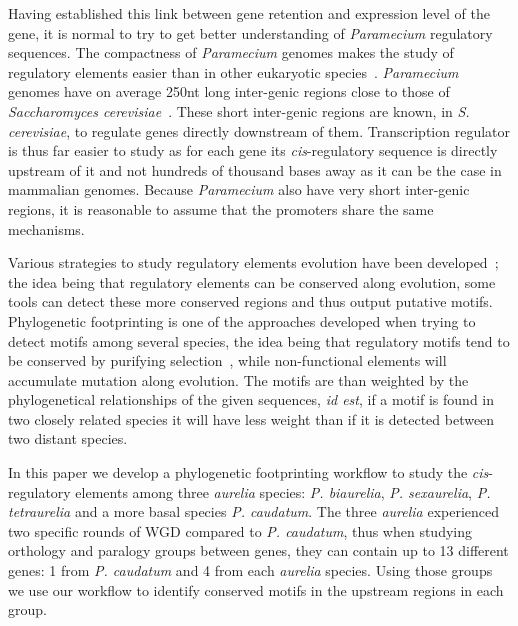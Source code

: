 Having established this link between gene retention and expression level of the gene, it is normal to try to get better understanding of \textit{Paramecium} regulatory sequences. The compactness of \textit{Paramecium} genomes makes the study of regulatory elements easier than in other eukaryotic species~\citep{mcgrath_insights_2014}. \textit{Paramecium} genomes have on average 250nt long inter-genic regions close to those of \textit{Saccharomyces cerevisiae}~\citep{chen_minimal_2011}. These short inter-genic regions are known, in \textit{S. cerevisiae}, to regulate genes directly downstream of them. Transcription regulator is thus far easier to study as for each gene its \textit{cis}-regulatory sequence is directly upstream of it and not hundreds of thousand bases away as it can be the case in mammalian genomes. Because \textit{Paramecium} also have very short inter-genic regions, it is reasonable to assume that the promoters share the same mechanisms.

Various strategies to study regulatory elements evolution have been developed~\citep{wittkopp_cis-regulatory_2012}; the idea being that regulatory elements can be conserved along evolution, some tools can detect these more conserved regions and thus output putative motifs. Phylogenetic footprinting is one of the approaches developed when trying to detect motifs among several species, the idea being that regulatory motifs tend to be conserved by purifying selection~\citep{nelson_conserved_2013}, while non-functional elements will accumulate mutation along evolution. The motifs are than weighted by the phylogenetical relationships of the given sequences, \textit{id est}, if a motif is found in two closely related species it will have less weight than if it is detected between two distant species.

In this paper we develop a phylogenetic footprinting workflow to study the \textit{cis}-regulatory elements among three \textit{aurelia} species: \textit{P. biaurelia}, \textit{P. sexaurelia}, \textit{P. tetraurelia} and a more basal species \textit{P. caudatum}. The three \textit{aurelia} experienced two specific rounds of WGD compared to \textit{P. caudatum}, thus when studying orthology and paralogy groups between genes, they can contain up to 13 different genes: 1 from \textit{P. caudatum} and 4 from each \textit{aurelia} species. Using those groups we use our workflow to identify conserved motifs in the upstream regions in each group.

